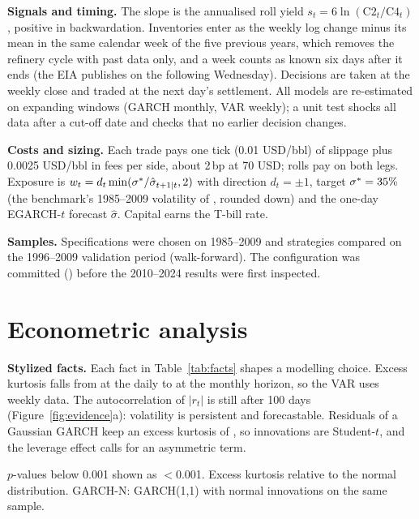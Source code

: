 \documentclass[10pt,a4paper]{article}
\newcommand{\tabnote}[1]{\par\vspace{2pt}\begin{minipage}{\linewidth}\scriptsize\color{muted}#1\end{minipage}}
\begin{document}
\textbf{Signals and timing.} The slope is the annualised roll yield $s_t = 6\ln(\mathrm{C2}_t/\mathrm{C4}_t)$, positive in backwardation. Inventories enter as the weekly log change minus its mean in the same calendar week of the five previous years, which removes the refinery cycle with past data only, and a week counts as known six days after it ends (the EIA publishes on the following Wednesday). Decisions are taken at the weekly close and traded at the next day's settlement. All models are re-estimated on expanding windows (GARCH monthly, VAR weekly); a unit test shocks all data after a cut-off date and checks that no earlier decision changes.

\textbf{Costs and sizing.} Each trade pays one tick (0.01 USD/bbl) of slippage plus 0.0025 USD/bbl in fees per side, about 2\,bp at 70 USD; rolls pay on both legs. Exposure is $w_t = d_t \min(\sigma^*/\hat\sigma_{t+1|t},2)$ with direction $d_t=\pm1$, target $\sigma^*=35\%$ (the benchmark's 1985--2009 volatility of \NBenchVolIs, rounded down) and the one-day EGARCH-$t$ forecast $\hat\sigma$. Capital earns the T-bill rate.

\textbf{Samples.} Specifications were chosen on 1985--2009 and strategies compared on the 1996--2009 validation period (walk-forward). The configuration was committed (\texttt{\NFreezeCommit}) before the 2010--2024 results were first inspected.

\section{Econometric analysis}
\textbf{Stylized facts.} Each fact in Table~\ref{tab:facts} \citep{cont2001} shapes a modelling choice. Excess kurtosis falls from \NKurtDaily{} at the daily to \NKurtMonthly{} at the monthly horizon, so the VAR uses weekly data. The autocorrelation of $|r_t|$ is still \NAcfAbsHundred{} after 100 days (Figure~\ref{fig:evidence}a): volatility is persistent and forecastable. Residuals of a Gaussian GARCH keep an excess kurtosis of \NKurtResid, so innovations are Student-$t$, and the leverage effect calls for an asymmetric term.

\begin{table}[t]
\centering\footnotesize
\caption{Stylized facts of daily log returns of the rolled second WTI contract}\label{tab:facts}
\resizebox{\linewidth}{!}{}
\tabnote{$p$-values below 0.001 shown as $<$0.001. Excess kurtosis relative to the normal distribution. GARCH-N: GARCH(1,1) with normal innovations on the same sample.}
\end{table}
\end{document}
